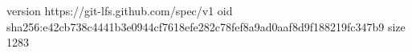 version https://git-lfs.github.com/spec/v1
oid sha256:e42cb738c4441b3e0944cf7618efe282c78fef8a9ad0aaf8d9f188219fc347b9
size 1283
